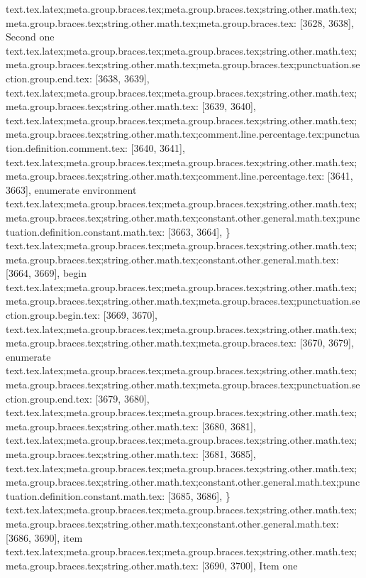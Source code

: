 {{{{{{{{{{{{{{{{{{{{{{{{{{{{{{{{{{{{{{{{{{{{{{{{{{{{{{{{{{{{{{{{{{{{{{{{{{{{{{{{{{{{{{{{{{{{{{{{{{{{{{{{{{{{{{{{{{text.tex.latex;meta.group.braces.tex;meta.group.braces.tex;string.other.math.tex;meta.group.braces.tex;string.other.math.tex;meta.group.braces.tex: [3628, 3638], {Second one}
text.tex.latex;meta.group.braces.tex;meta.group.braces.tex;string.other.math.tex;meta.group.braces.tex;string.other.math.tex;meta.group.braces.tex;punctuation.section.group.end.tex: [3638, 3639], {}}
text.tex.latex;meta.group.braces.tex;meta.group.braces.tex;string.other.math.tex;meta.group.braces.tex;string.other.math.tex: [3639, 3640], {
}
text.tex.latex;meta.group.braces.tex;meta.group.braces.tex;string.other.math.tex;meta.group.braces.tex;string.other.math.tex;comment.line.percentage.tex;punctuation.definition.comment.tex: [3640, 3641], {%
text.tex.latex;meta.group.braces.tex;meta.group.braces.tex;string.other.math.tex;meta.group.braces.tex;string.other.math.tex;comment.line.percentage.tex: [3641, 3663], {enumerate environment
}
text.tex.latex;meta.group.braces.tex;meta.group.braces.tex;string.other.math.tex;meta.group.braces.tex;string.other.math.tex;constant.other.general.math.tex;punctuation.definition.constant.math.tex: [3663, 3664], {\}
text.tex.latex;meta.group.braces.tex;meta.group.braces.tex;string.other.math.tex;meta.group.braces.tex;string.other.math.tex;constant.other.general.math.tex: [3664, 3669], {begin}
text.tex.latex;meta.group.braces.tex;meta.group.braces.tex;string.other.math.tex;meta.group.braces.tex;string.other.math.tex;meta.group.braces.tex;punctuation.section.group.begin.tex: [3669, 3670], {{}
text.tex.latex;meta.group.braces.tex;meta.group.braces.tex;string.other.math.tex;meta.group.braces.tex;string.other.math.tex;meta.group.braces.tex: [3670, 3679], {enumerate}
text.tex.latex;meta.group.braces.tex;meta.group.braces.tex;string.other.math.tex;meta.group.braces.tex;string.other.math.tex;meta.group.braces.tex;punctuation.section.group.end.tex: [3679, 3680], {}}
text.tex.latex;meta.group.braces.tex;meta.group.braces.tex;string.other.math.tex;meta.group.braces.tex;string.other.math.tex: [3680, 3681], {
}
text.tex.latex;meta.group.braces.tex;meta.group.braces.tex;string.other.math.tex;meta.group.braces.tex;string.other.math.tex: [3681, 3685], {    }
text.tex.latex;meta.group.braces.tex;meta.group.braces.tex;string.other.math.tex;meta.group.braces.tex;string.other.math.tex;constant.other.general.math.tex;punctuation.definition.constant.math.tex: [3685, 3686], {\}
text.tex.latex;meta.group.braces.tex;meta.group.braces.tex;string.other.math.tex;meta.group.braces.tex;string.other.math.tex;constant.other.general.math.tex: [3686, 3690], {item}
text.tex.latex;meta.group.braces.tex;meta.group.braces.tex;string.other.math.tex;meta.group.braces.tex;string.other.math.tex: [3690, 3700], { Item one
}}}}}}}}}}}}}}}}}}}}}}}}}}}}}}}}}}}}}}}}}}}}}}}}}}}}}}}}}}}}}}}}}}}}}}}}}}}}}}}}}}}}}}}}}}}}}}}}}}}}}}}}}}}}}}}}}}}}}
